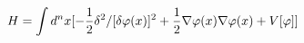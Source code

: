 \begin{equation}
H= \int d^n x [ -{1 \over 2} \delta^2/[\delta \varphi(x)]^2+ {1 \over 2}
\nabla
\varphi(x) \nabla \varphi(x) + V[\varphi] ]
\end{equation}

